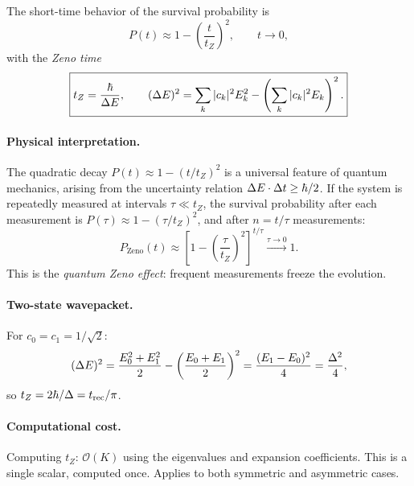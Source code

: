 \begin{result}\label{res:zeno}
The short-time behavior of the survival probability is
\begin{equation}\label{eq:P_short}
  P(t) \approx 1 - \left(\frac{t}{t_Z}\right)^2, \qquad t \to 0,
\end{equation}
with the \emph{Zeno time}
\begin{equation}\label{eq:tZ}
  \boxed{t_Z = \frac{\hbar}{\Delta E}, \qquad (\Delta E)^2 = \sum_k |c_k|^2 E_k^2 - \left(\sum_k |c_k|^2 E_k\right)^2.}
\end{equation}
\end{result}

\paragraph{Physical interpretation.}
The quadratic decay $P(t) \approx 1 - (t/t_Z)^2$ is a universal feature of quantum mechanics, arising from the uncertainty relation $\Delta E\cdot\Delta t \geq \hbar/2$.
If the system is repeatedly measured at intervals $\tau \ll t_Z$, the survival probability after each measurement is $P(\tau) \approx 1 - (\tau/t_Z)^2$, and after $n = t/\tau$ measurements:
\begin{equation}
  P_{\text{Zeno}}(t) \approx \left[1 - \left(\frac{\tau}{t_Z}\right)^2\right]^{t/\tau}
  \xrightarrow{\tau\to 0} 1.
\end{equation}
This is the \emph{quantum Zeno effect}: frequent measurements freeze the evolution.

\paragraph{Two-state wavepacket.}
For $c_0 = c_1 = 1/\sqrt{2}$:
\begin{equation}
  (\Delta E)^2 = \frac{E_0^2 + E_1^2}{2} - \left(\frac{E_0 + E_1}{2}\right)^2 = \frac{(E_1 - E_0)^2}{4} = \frac{\Delta^2}{4},
\end{equation}
so $t_Z = 2\hbar/\Delta = t_{\text{rec}}/\pi$.

\paragraph{Computational cost.}
Computing $t_Z$: $\mathcal{O}(K)$ using the eigenvalues and expansion coefficients.
This is a single scalar, computed once.
Applies to both symmetric and asymmetric cases.


